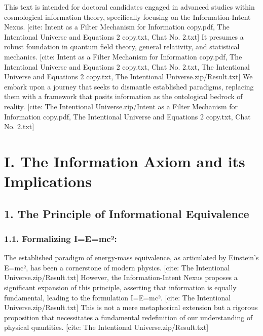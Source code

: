 \documentclass[12pt]{article}
\begin{document}
This text is intended for doctoral candidates engaged in advanced studies within cosmological information theory, specifically focusing on the Information-Intent Nexus.
[cite: Intent as a Filter Mechanism for Information copy.pdf, The Intentional Universe and Equations 2 copy.txt, Chat No. 2.txt] It presumes a robust foundation in quantum field theory, general relativity, and statistical mechanics.
[cite: Intent as a Filter Mechanism for Information copy.pdf, The Intentional Universe and Equations 2 copy.txt, Chat No. 2.txt, The Intentional Universe and Equations 2 copy.txt, The Intentional Universe.zip/Result.txt] We embark upon a journey that seeks to dismantle established paradigms, replacing them with a framework that posits information as the ontological bedrock of reality.
[cite: The Intentional Universe.zip/Intent as a Filter Mechanism for Information copy.pdf, The Intentional Universe and Equations 2 copy.txt, Chat No. 2.txt]

\part*{I. The Information Axiom and its Implications}

\chapter{1. The Principle of Informational Equivalence}

\section*{1.1. Formalizing I=E=mc²:}

The established paradigm of energy-mass equivalence, as articulated by Einstein’s E=mc², has been a cornerstone of modern physics.
[cite: The Intentional Universe.zip/Result.txt] However, the Information-Intent Nexus proposes a significant expansion of this principle, asserting that information is equally fundamental, leading to the formulation I=E=mc².
[cite: The Intentional Universe.zip/Result.txt] This is not a mere metaphorical extension but a rigorous proposition that necessitates a fundamental redefinition of our understanding of physical quantities.
[cite: The Intentional Universe.zip/Result.txt]
\end{document}
